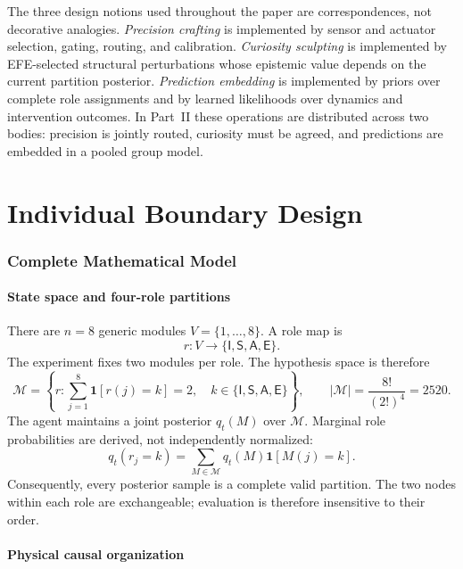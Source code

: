 \documentclass[11pt,a4paper]{article}
\numberwithin{equation}{section}
\newcommand{\Irole}{\mathsf{I}}
\newcommand{\Srole}{\mathsf{S}}
\newcommand{\Arole}{\mathsf{A}}
\newcommand{\Erole}{\mathsf{E}}
\newcommand{\Mset}{\mathcal{M}}
\begin{document}
The three design notions used throughout the paper are correspondences, not
decorative analogies. \emph{Precision crafting} is implemented by sensor and
actuator selection, gating, routing, and calibration. \emph{Curiosity
sculpting} is implemented by EFE-selected structural perturbations whose
epistemic value depends on the current partition posterior. \emph{Prediction
embedding} is implemented by priors over complete role assignments and by
learned likelihoods over dynamics and intervention outcomes. In Part~II these
operations are distributed across two bodies: precision is jointly routed,
curiosity must be agreed, and predictions are embedded in a pooled group
model.

\part{Individual Boundary Design}

\section{Complete Mathematical Model}

\subsection{State space and four-role partitions}

There are $n=8$ generic modules $V=\{1,\ldots,8\}$. A role map is
\begin{equation}
 r:V\rightarrow\{\Irole,\Srole,\Arole,\Erole\}.
 \label{eq:role-map}
\end{equation}
The experiment fixes two modules per role. The hypothesis space is therefore
\begin{equation}
 \Mset=\left\{r:\sum_{j=1}^{8}\mathbf 1[r(j)=k]=2,
 \quad k\in\{\Irole,\Srole,\Arole,\Erole\}\right\},
 \qquad |\Mset|=\frac{8!}{(2!)^4}=2520.
 \label{eq:partition-space}
\end{equation}
The agent maintains a joint posterior $q_t(M)$ over $\Mset$. Marginal role
probabilities are derived, not independently normalized:
\begin{equation}
 q_t(r_j=k)=\sum_{M\in\Mset}q_t(M)\mathbf 1[M(j)=k].
 \label{eq:marginals}
\end{equation}
Consequently, every posterior sample is a complete valid partition. The two
nodes within each role are exchangeable; evaluation is therefore insensitive
to their order.

\subsection{Physical causal organization}
\end{document}

